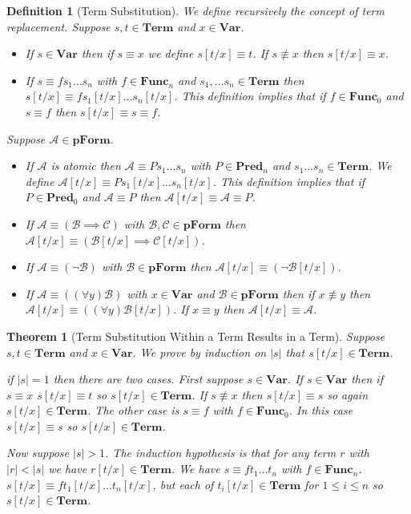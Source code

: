 \documentclass[12pt]{article}
\theoremstyle{break}
\newtheorem{definition}{Definition}[section]
\theoremstyle{break}
\newtheorem{theorem}{Theorem}[section]
\theoremstyle{break}
\theoremstyle{break}
\newcommand{\mc}[1]{\mathcal{#1}}
\begin{document}
\begin{definition}[Term Substitution]
We define recursively the concept of term replacement.
Suppose $s, t \in \textbf{Term}$ and $x\in \textbf{Var}$.
\begin{itemize}
\item{If $s\in\textbf{Var}$ then if $s\equiv x$ we define $s[t/x] \equiv t$. If $s\not \equiv x$ then $s[t/x] \equiv x$.}
\item{If $s \equiv fs_1\ldots s_n$ with $f\in\textbf{Func}_n$ and $s_1, \ldots s_n \in \textbf{Term}$ then $s[t/x] \equiv fs_1[t/x]\ldots s_n[t/x]$. This definition implies that if $f\in \textbf{Func}_0$ and $s\equiv f$ then $s[t/x] \equiv s \equiv f$.}
\end{itemize}

Suppose $\mc{A} \in \textbf{pForm}$.
\begin{itemize}
\item{If $\mc{A}$ is atomic then $\mc{A} \equiv Ps_1\ldots s_n$ with $P\in\textbf{Pred}_n$ and $s_1\ldots s_n\in\textbf{Term}$. We define $\mc{A}[t/x] \equiv Ps_1[t/x]\ldots s_n[t/x]$. This definition implies that if $P\in\textbf{Pred}_0$ and $\mc{A}\equiv P$ then $\mc{A}[t/x] \equiv \mc{A} \equiv P$.}
\item{If $\mc{A} \equiv (\mc{B} \implies \mc{C})$ with $\mc{B}, \mc{C}\in\textbf{pForm}$ then $\mc{A}[t/x] \equiv (\mc{B}[t/x] \implies \mc{C}[t/x])$.}
\item{If $\mc{A} \equiv (\lnot \mc{B})$ with $\mc{B}\in\textbf{pForm}$ then $\mc{A}[t/x] \equiv (\lnot \mc{B}[t/x])$.}
\item{If $\mc{A} \equiv ((\forall y) \mc{B})$ with $x\in\textbf{Var}$ and $\mc{B}\in\textbf{pForm}$ then if $x\not \equiv y$ then $\mc{A}[t/x] \equiv ((\forall y) \mc{B}[t/x])$. If $x \equiv y$ then $\mc{A}[t/x] \equiv \mc{A}$.}
\end{itemize}

\end{definition}

\begin{theorem}[Term Substitution Within a Term Results in a Term]
Suppose $s, t\in\textbf{Term}$ and $x\in\textbf{Var}$.
We prove by induction on $|s|$ that $s[t/x] \in \textbf{Term}$.

if $|s| = 1$ then there are two cases. 
First suppose $s\in \textbf{Var}$.
If $s\in \textbf{Var}$ then if $s\equiv x$ $s[t/x] \equiv t$ so $s[t/x]\in\textbf{Term}$. 
If $s \not \equiv x$ then $s[t/x] \equiv s$ so again $s[t/x] \in \textbf{Term}$.
The other case is $s\equiv f$ with $f\in \textbf{Func}_0$.
In this case $s[t/x] \equiv s$ so $s[t/x] \in \textbf{Term}$.

Now suppose $|s| > 1$.
The induction hypothesis is that for any term $r$ with $|r|<|s|$ we have $r[t/x] \in \textbf{Term}$.
We have $s\equiv ft_1\ldots t_n$ with $f\in\textbf{Func}_n$. $s[t/x] \equiv f t_1[t/x]\ldots t_n[t/x]$, but each of $t_i[t/x]\in\textbf{Term}$ for $1\le i \le n$ so $s[t/x]\in\textbf{Term}$.
\end{theorem}
\end{document}
